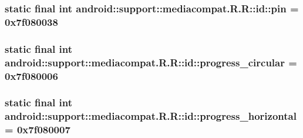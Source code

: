 \hypertarget{classandroid_1_1support_1_1mediacompat_1_1_r_1_1id_0ba6cb012e8e8590b8bc19733ce8c41c}{
\subsubsection[{pin}]{\setlength{\rightskip}{0pt plus 5cm}static final int android::support::mediacompat.R.R::id::pin = 0x7f080038}}
\label{classandroid_1_1support_1_1mediacompat_1_1_r_1_1id_0ba6cb012e8e8590b8bc19733ce8c41c}


\hypertarget{classandroid_1_1support_1_1mediacompat_1_1_r_1_1id_344df3dd4a61e7837347370d6f888d79}{
\subsubsection[{progress\_\-circular}]{\setlength{\rightskip}{0pt plus 5cm}static final int android::support::mediacompat.R.R::id::progress\_\-circular = 0x7f080006}}
\label{classandroid_1_1support_1_1mediacompat_1_1_r_1_1id_344df3dd4a61e7837347370d6f888d79}


\hypertarget{classandroid_1_1support_1_1mediacompat_1_1_r_1_1id_d2e86f65769e2fe659cf08990b96b310}{
\subsubsection[{progress\_\-horizontal}]{\setlength{\rightskip}{0pt plus 5cm}static final int android::support::mediacompat.R.R::id::progress\_\-horizontal = 0x7f080007}}
\label{classandroid_1_1support_1_1mediacompat_1_1_r_1_1id_d2e86f65769e2fe659cf08990b96b310}



